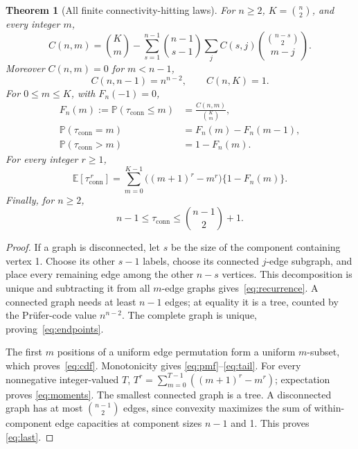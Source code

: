 \documentclass[10pt]{article}
\newtheorem{theorem}{Theorem}
\newcommand{\E}{\mathbb E}
\newcommand{\Pp}{\mathbb P}
\newcommand{\conn}{\mathrm{conn}}
\begin{document}
\begin{theorem}[All finite connectivity-hitting laws]\label{thm:finite}
For $n\geq2$, $K=\binom n2$, and every integer $m$,
\begin{equation}\label{eq:recurrence}
 C(n,m)=\binom Km-\sum_{s=1}^{n-1}\binom{n-1}{s-1}
 \sum_j C(s,j)\binom{\binom{n-s}{2}}{m-j}.
\end{equation}
Moreover $C(n,m)=0$ for $m<n-1$,
\begin{equation}\label{eq:endpoints}
 C(n,n-1)=n^{n-2},\qquad C(n,K)=1.
\end{equation}
For $0\leq m\leq K$, with $F_n(-1)=0$,
\begin{align}
 F_n(m):=\Pp(\tau_{\conn}\leq m)&=\frac{C(n,m)}{\binom Km},\label{eq:cdf}\\
 \Pp(\tau_{\conn}=m)&=F_n(m)-F_n(m-1),\label{eq:pmf}\\
 \Pp(\tau_{\conn}>m)&=1-F_n(m).\label{eq:tail}
\end{align}
For every integer $r\geq1$,
\begin{equation}\label{eq:moments}
 \E[\tau_{\conn}^{\,r}]=\sum_{m=0}^{K-1}\bigl((m+1)^r-m^r\bigr)
 \{1-F_n(m)\}.
\end{equation}
Finally, for $n\geq2$,
\begin{equation}\label{eq:last}
 n-1\leq\tau_{\conn}\leq\binom{n-1}{2}+1.
\end{equation}
\end{theorem}

\begin{proof}
If a graph is disconnected, let $s$ be the size of the component containing
vertex 1.  Choose its other $s-1$ labels, choose its connected $j$-edge
subgraph, and place every remaining edge among the other $n-s$ vertices.
This decomposition is unique and subtracting it from all $m$-edge graphs
gives~\eqref{eq:recurrence}.  A connected graph needs at least $n-1$ edges;
at equality it is a tree, counted by the Pr\"ufer-code value $n^{n-2}$.
The complete graph is unique, proving~\eqref{eq:endpoints}.

The first $m$ positions of a uniform edge permutation form a uniform
$m$-subset, which proves~\eqref{eq:cdf}.  Monotonicity gives
\eqref{eq:pmf}--\eqref{eq:tail}.  For every nonnegative integer-valued $T$,
$T^r=\sum_{m=0}^{T-1}((m+1)^r-m^r)$; expectation proves
\eqref{eq:moments}.  The smallest connected graph is a tree.  A disconnected
graph has at most $\binom{n-1}{2}$ edges, since convexity maximizes the sum of
within-component edge capacities at component sizes $n-1$ and 1.  This proves
\eqref{eq:last}.
\end{proof}
\end{document}
